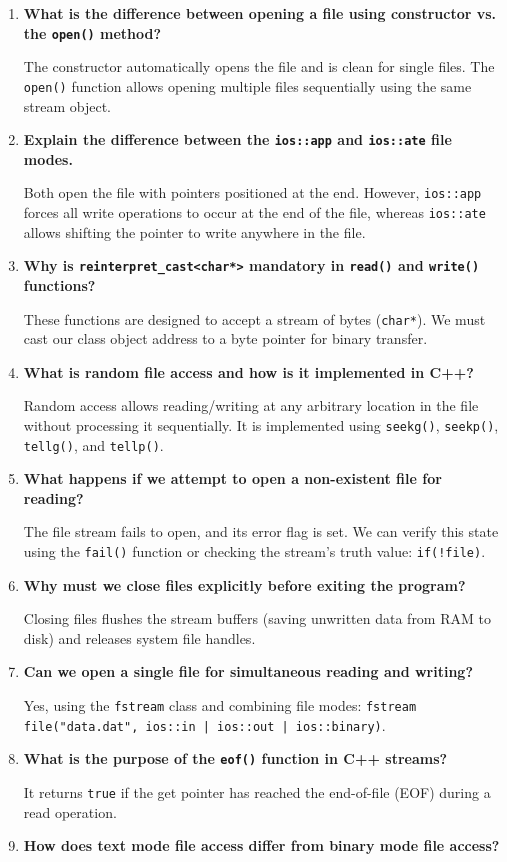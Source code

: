 \documentclass[12pt,a4paper]{article}
\newcommand{\Q}[1]{\textbf{#1}\par\noindent\ignorespaces}
\begin{document}
\begin{tcolorbox}[exambox, title={\textbf{Frequently Asked / Viva Questions}}]
\begin{enumerate}[topsep=0pt, label=\textbf{Q\arabic*.}, itemsep=5pt]
  \item \Q{What is the difference between opening a file using constructor vs. the \texttt{open()} method?}
    The constructor automatically opens the file and is clean for single files. The \texttt{open()} function allows opening multiple files sequentially using the same stream object.
  \item \Q{Explain the difference between the \texttt{ios::app} and \texttt{ios::ate} file modes.}
    Both open the file with pointers positioned at the end. However, \texttt{ios::app} forces all write operations to occur at the end of the file, whereas \texttt{ios::ate} allows shifting the pointer to write anywhere in the file.
  \item \Q{Why is \texttt{reinterpret\_cast<char*>} mandatory in \texttt{read()} and \texttt{write()} functions?}
    These functions are designed to accept a stream of bytes (\texttt{char*}). We must cast our class object address to a byte pointer for binary transfer.
  \item \Q{What is random file access and how is it implemented in C++?}
    Random access allows reading/writing at any arbitrary location in the file without processing it sequentially. It is implemented using \texttt{seekg()}, \texttt{seekp()}, \texttt{tellg()}, and \texttt{tellp()}.
  \item \Q{What happens if we attempt to open a non-existent file for reading?}
    The file stream fails to open, and its error flag is set. We can verify this state using the \texttt{fail()} function or checking the stream's truth value: \texttt{if(!file)}.
  \item \Q{Why must we close files explicitly before exiting the program?}
    Closing files flushes the stream buffers (saving unwritten data from RAM to disk) and releases system file handles.
  \item \Q{Can we open a single file for simultaneous reading and writing?}
    Yes, using the \texttt{fstream} class and combining file modes: \texttt{fstream file("data.dat", ios::in | ios::out | ios::binary)}.
  \item \Q{What is the purpose of the \texttt{eof()} function in C++ streams?}
    It returns \texttt{true} if the get pointer has reached the end-of-file (EOF) during a read operation.
  \item \Q{How does text mode file access differ from binary mode file access?}

\end{enumerate}
\end{tcolorbox}
\end{document}
